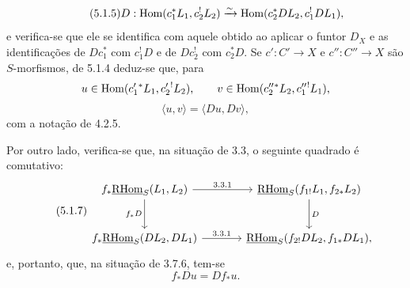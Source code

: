 \begin{equation}
\tag{5.1.5}
D:\operatorname{Hom}(c_1^*L_1,c_2^!L_2)\xrightarrow{\sim}\operatorname{Hom}(c_2^*DL_2,c_1^!DL_1),
\end{equation}
e verifica-se que ele se identifica com aquele obtido ao aplicar o funtor $D_X$ e as identificações de $Dc_1^*$ com $c_1^!D$ e de $Dc_2^!$ com $c_2^*D$. Se $c':C'\to X$ e $c'':C''\to X$ são $S$-morfismos, de 5.1.4 deduz-se que, para
\[
u\in\operatorname{Hom}(c_1'{}^*L_1,c_2'{}^!L_2),\qquad v\in\operatorname{Hom}(c_2''{}^*L_2,c_1''{}^!L_1),\]
\begin{equation}
\tag{5.1.6}
\langle u,v\rangle=\langle Du,Dv\rangle,
\end{equation}
com a notação de 4.2.5.

Por outro lado, verifica-se que, na situação de 3.3, o seguinte quadrado é comutativo:
\begin{equation}
\tag{5.1.7}
\begin{tikzcd}[column sep=large,row sep=large]
f_*\uRHom_S(L_1,L_2) \arrow[r,"3.3.1"] \arrow[d,"f_*D"']
& \uRHom_S(f_{1!}L_1,f_{2*}L_2) \arrow[d,"D"] \\
f_*\uRHom_S(DL_2,DL_1) \arrow[r,"3.3.1"]
& \uRHom_S(f_{2!}DL_2,f_{1*}DL_1),
\end{tikzcd}
\end{equation}
e, portanto, que, na situação de 3.7.6, tem-se
\begin{equation}
\tag{5.1.8}
f_*Du=Df_*u.
\end{equation}
